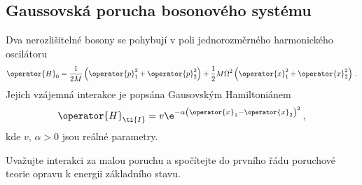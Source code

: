 \subsection{Gaussovská porucha bosonového systému}\label{sec:IdenticalBosons}
	Dva nerozlišitelné bosony se pohybují v poli jednorozměrného harmonického oscilátoru
	\begin{equation}
		\operator{H}_{0}
			=\frac{1}{2M}\left(\operator{p}_{1}^{2}+\operator{p}_{2}^{2}\right)
				+\frac{1}{2}M\Omega^{2}\left(\operator{x}_{1}^{2}+\operator{x}_{2}^{2}\right)\,.
	\end{equation}
	Jejich vzájemná interakce je popsána Gausovským Hamiltoniánem
	\begin{equation}
		\operator{H}_{\ti{I}}
			=v\e^{-\alpha\left(\operator{x}_{1}-\operator{x}_{2}\right)^{2}}\,,
	\end{equation}
	kde $v$, $\alpha>0$ jsou reálné parametry.
	
	Uvažujte interakci za malou poruchu a spočítejte do prvního řádu poruchové teorie 
	opravu k energii základního stavu.
	
